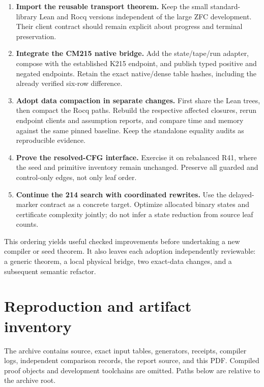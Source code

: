 \documentclass[11pt]{article}
\begin{document}
\begin{enumerate}
\item \textbf{Import the reusable transport theorem.} Keep the small standard-library Lean and Rocq versions independent of the large ZFC development. Their client contract should remain explicit about progress and terminal preservation.
\item \textbf{Integrate the CM215 native bridge.} Add the state/tape/run adapter, compose with the established K215 endpoint, and publish typed positive and negated endpoints. Retain the exact native/dense table hashes, including the already verified six-row difference.
\item \textbf{Adopt data compaction in separate changes.} First share the Lean trees, then compact the Rocq paths. Rebuild the respective affected closures, rerun endpoint clients and assumption reports, and compare time and memory against the same pinned baseline. Keep the standalone equality audits as reproducible evidence.
\item \textbf{Prove the resolved-CFG interface.} Exercise it on rebalanced R41, where the seed and primitive inventory remain unchanged. Preserve all guarded and control-only edges, not only leaf order.
\item \textbf{Continue the 214 search with coordinated rewrites.} Use the delayed-marker contract as a concrete target. Optimize allocated binary states and certificate complexity jointly; do not infer a state reduction from source leaf counts.
\end{enumerate}

This ordering yields useful checked improvements before undertaking a new compiler or seed theorem. It also leaves each adoption independently reviewable: a generic theorem, a local physical bridge, two exact-data changes, and a subsequent semantic refactor.

\section{Reproduction and artifact inventory}

The archive contains source, exact input tables, generators, receipts, compiler logs, independent comparison records, the report source, and this PDF. Compiled proof objects and development toolchains are omitted. Paths below are relative to the archive root.
\end{document}
